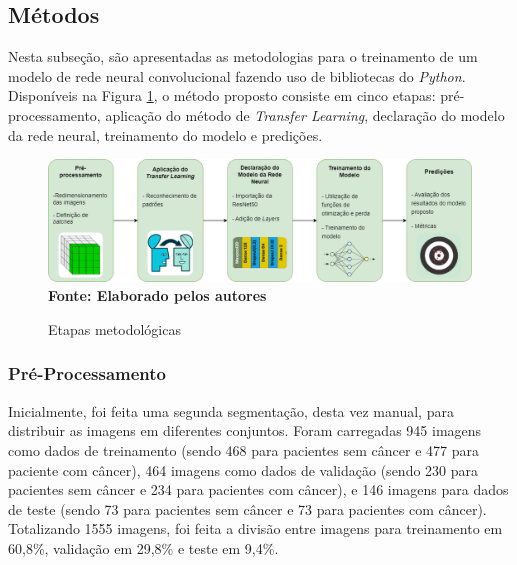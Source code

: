 

\subsection{\esp Métodos} \label{metodos}

Nesta subseção, são apresentadas as metodologias para o treinamento de um modelo de rede neural convolucional fazendo uso de bibliotecas do \textit{Python}. Disponíveis na Figura \ref{fig:diagrama}, o método proposto consiste em cinco etapas: pré-processamento, aplicação do método de \textit{Transfer Learning}, declaração do modelo da rede neural, treinamento do modelo e predições.

\begin{figure}[ht]
 	\centering	
 	\caption[\hspace{0.1cm}Grade Computacional.]{Etapas metodológicas}
 	\vspace{-0.2cm}
 	\includegraphics[width=1\textwidth]{figuras/tcc_diagrama.drawio.png}
    \captionsetup{justification=centering}
  \vspace{-0.2cm}
     \\\textbf{\footnotesize Fonte: Elaborado pelos autores}
	\label{fig:diagrama}
\end{figure}




\subsubsection{\esp Pré-Processamento} \label{preprocess}

Inicialmente, foi feita uma segunda segmentação, desta vez manual, para distribuir as imagens em diferentes conjuntos. Foram carregadas 945 imagens como dados de treinamento (sendo 468 para pacientes sem câncer e 477 para paciente com câncer), 464 imagens como dados de validação (sendo 230 para pacientes sem câncer e 234 para pacientes com câncer), e 146 imagens para dados de teste (sendo 73 para pacientes sem câncer e 73 para pacientes com câncer). Totalizando 1555 imagens, foi feita a divisão entre imagens para treinamento em 60,8\%, validação em 29,8\% e teste em 9,4\%.


